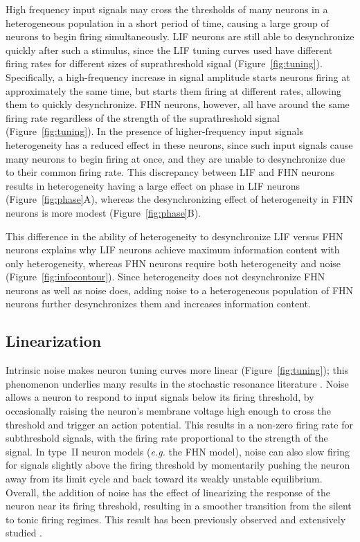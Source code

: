 \documentclass[12pt]{article}
\begin{document}
High frequency input signals may cross the thresholds of many neurons
in a heterogeneous population in a short period of time,
causing a large group of neurons to begin firing simultaneously.
LIF neurons are still able to desynchronize quickly after such a stimulus,
since the LIF tuning curves used have different firing rates
for different sizes of suprathreshold signal (Figure~\ref{fig:tuning}).
Specifically, a high-frequency increase in signal amplitude
starts neurons firing at approximately the same time,
but starts them firing at different rates,
allowing them to quickly desynchronize.
FHN neurons, however, all have around the same firing rate
regardless of the strength
of the suprathreshold signal (Figure~\ref{fig:tuning}).
In the presence of higher-frequency input signals
heterogeneity has a reduced effect in these neurons,
since such input signals cause many neurons to begin firing at once,
and they are unable to desynchronize due to their common firing rate.
This discrepancy between LIF and FHN neurons results in heterogeneity
having a large effect on phase in LIF neurons (Figure~\ref{fig:phase}A),
whereas the desynchronizing effect of heterogeneity
in FHN neurons is more modest (Figure~\ref{fig:phase}B).

This difference in the ability of heterogeneity to desynchronize LIF versus FHN neurons
explains why LIF neurons achieve maximum information content with only heterogeneity,
whereas FHN neurons require both heterogeneity and noise (Figure~\ref{fig:infocontour}).
Since heterogeneity does not desynchronize FHN neurons as well as noise does,
adding noise to a heterogeneous population of FHN neurons further desynchronizes them
and increases information content.

\subsection{Linearization}

Intrinsic noise makes neuron tuning curves more linear
(Figure~\ref{fig:tuning});
this phenomenon underlies many results in the stochastic resonance literature
\citep{Chialvo1997}.
Noise allows a neuron to respond to input signals below its firing threshold,
by occasionally raising the neuron's membrane voltage high enough
to cross the threshold and trigger an action potential.
This results in a non-zero firing rate for subthreshold signals,
with the firing rate proportional to the strength of the signal.
In type~II neuron models (\emph{e.g.} the FHN model),
noise can also slow firing for signals slightly above the firing threshold
by momentarily pushing the neuron away from its limit cycle
and back toward its weakly unstable equilibrium.
Overall, the addition of noise has the effect
of linearizing the response of the neuron near its firing threshold,
resulting in a smoother transition from the silent to tonic firing regimes.
This result has been previously observed and extensively studied \citep{Stocks1996,Chialvo1997,Chance2002,Prescott2002,Shu2003}.
\end{document}
